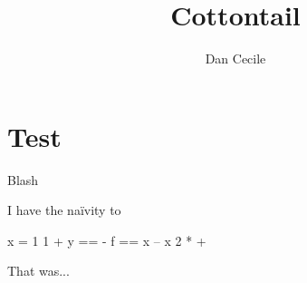 \documentclass[draft]{memoir}
\begin{document}
\pagestyle{empty}

\title{Cottontail}
\author{Dan Cecile}
\maketitle



\frontmatter



\cleartooddpage
\tableofcontents

\mainmatter





\chapter{Test}
Blash \cite{GOTO} 

I have the naïvity to

\begin{ccode}
x = 1 1 +
y == -
f == x -- x 2 * +
\end{ccode}

That was...

\backmatter




\printindex

\end{document}

